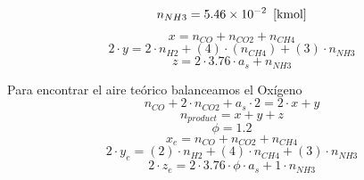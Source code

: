 \documentclass[10pt,fleqn]{article}
\begin{document}
{\color{blue} \rm}
\begin{equation}
\label{EES Eqn:12}
n_{NH3} = 5.46\times 10^{-2}   \   \left[ \rm kmol \right] 
\end{equation}
{\color{blue} \rm}
\begin{equation}
\label{EES Eqn:13}
x = n_{CO} + n_{CO2} + n_{CH4} 
\end{equation}
\begin{equation}
\label{EES Eqn:14}
2\cdot y = 2\cdot n_{H2} +  \left( 4 \right) \cdot  \left( n_{CH4} \right)  +  \left( 3 \right) \cdot n_{NH3} 
\end{equation}
\begin{equation}
\label{EES Eqn:15}
z = 2 \cdot  3.76 \cdot  a_{s} + n_{NH3} 
\end{equation}

\vspace{0.10in}
\noindent
{\color{blue} \rm Para encontrar el aire teórico balanceamos el Oxígeno}
\begin{equation}
\label{EES Eqn:16}
n_{CO} + 2\cdot n_{CO2} + a_{s}\cdot 2 = 2\cdot x + y 
\end{equation}
\begin{equation}
\label{EES Eqn:17}
n_{product} = x + y + z 
\end{equation}
\begin{equation}
\label{EES Eqn:18}
\phi = 1.2 
\end{equation}
\begin{equation}
\label{EES Eqn:19}
x_{e} = n_{CO} + n_{CO2} + n_{CH4} 
\end{equation}
\begin{equation}
\label{EES Eqn:20}
2\cdot y_{e} =  \left( 2 \right) \cdot n_{H2} +  \left( 4 \right) \cdot n_{CH4} +  \left( 3 \right) \cdot n_{NH3} 
\end{equation}
\begin{equation}
\label{EES Eqn:21}
2\cdot z_{e} = 2\cdot  3.76 \cdot  \phi \cdot  a_{s} + 1 \cdot  n_{NH3} 
\end{equation}
\end{document}
